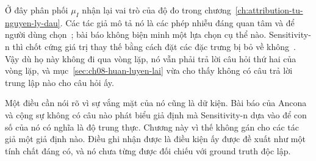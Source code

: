 Ở đây phân phối $\mu_I$ nhận lại vai trò của độ đo trong
chương~\ref{ch:attribution-tu-nguyen-ly-dau}. Các tác giả mô tả nó là các phép
nhiễu đáng quan tâm và để người dùng chọn~\autocite{minfid}; bài báo không biện
minh một lựa chọn cụ thể nào. Sensitivity-n thì chốt cứng giá trị thay thế bằng
cách đặt các đặc trưng bị bỏ về không~\autocite{msensn}. Vậy dù họ này không đi
qua vòng lặp, nó vẫn phải trả lời câu hỏi thứ hai của vòng lặp, và
mục~\ref{sec:ch08-huan-luyen-lai} vừa cho thấy không có câu trả lời trung lập
nào cho câu hỏi ấy.

Một điều cần nói rõ vì sự vắng mặt của nó cũng là dữ kiện. Bài báo của Ancona và
cộng sự không có câu nào phát biểu giả định mà Sensitivity-n dựa vào để con số
của nó có nghĩa là độ trung thực. Chương này vì thế không gán cho các tác giả
một giả định nào. Điều ghi nhận được là điều kiện ấy được đề xuất như một tính
chất đáng có, và nó chưa từng được đối chiếu với ground truth độc lập.
